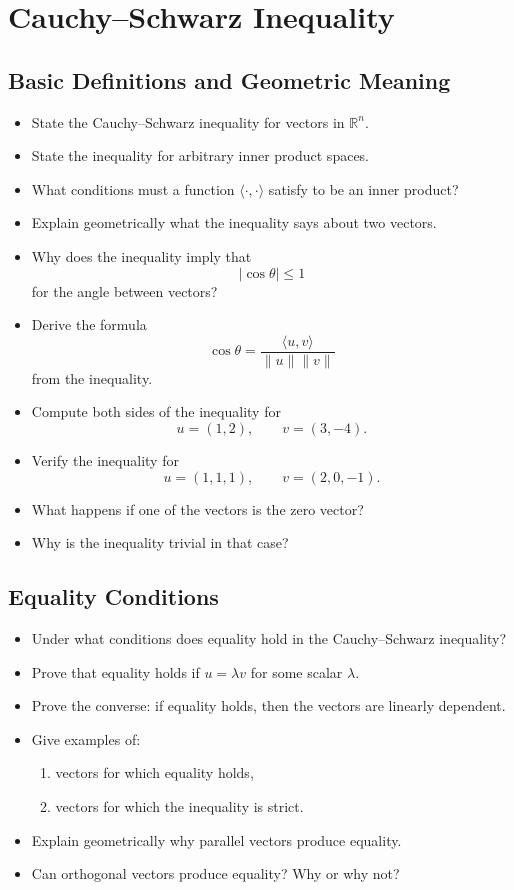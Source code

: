 \section{Cauchy–Schwarz Inequality}

\subsection{Basic Definitions and Geometric Meaning}

\begin{itemize}
  \item State the Cauchy--Schwarz inequality for vectors in \(\mathbb{R}^{n}\).
  \item State the inequality for arbitrary inner product spaces.
  \item What conditions must a function \(\langle \cdot,\cdot\rangle\) satisfy to be an inner product?
  \item Explain geometrically what the inequality says about two vectors.
  \item Why does the inequality imply that
    \[ |\cos\theta| \le 1 \]
    for the angle between vectors?
  \item Derive the formula
    \[ \cos\theta = \frac{\langle u,v\rangle}{\|u\|\|v\|} \]
    from the inequality.
  \item Compute both sides of the inequality for
    \[ u=(1,2), \qquad v=(3,-4). \]
  \item Verify the inequality for
    \[ u=(1,1,1), \qquad v=(2,0,-1). \]
  \item What happens if one of the vectors is the zero vector?
  \item Why is the inequality trivial in that case?
\end{itemize}

\subsection{Equality Conditions}

\begin{itemize}[resume]
  \item Under what conditions does equality hold in the Cauchy--Schwarz inequality?
  \item Prove that equality holds if \(u=\lambda v\) for some scalar \(\lambda\).
  \item Prove the converse: if equality holds, then the vectors are linearly dependent.
  \item Give examples of:
    \begin{enumerate}
      \item vectors for which equality holds,
      \item vectors for which the inequality is strict.
    \end{enumerate}
  \item Explain geometrically why parallel vectors produce equality.
  \item Can orthogonal vectors produce equality? Why or why not?
\end{itemize}

